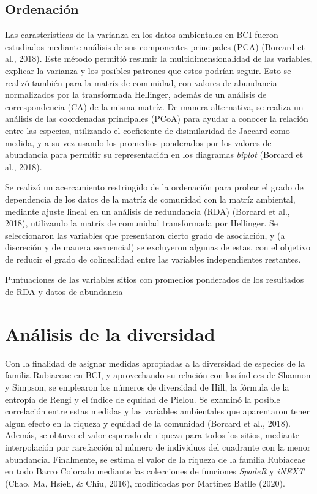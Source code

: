 \documentclass[11pt,]{article}
\begin{document}
\subsection{Ordenación}\label{ordenaciuxf3n}

Las carasteristicas de la varianza en los datos ambientales en BCI
fueron estudiados mediante análisis de sus componentes principales (PCA)
(Borcard et al., 2018). Este método permitió resumir la
multidimensionalidad de las variables, explicar la varianza y los
posibles patrones que estos podrían seguir. Esto se realizó también para
la matríz de comunidad, con valores de abundancia normalizados por la
transformada Hellinger, además de un análisis de correspondencia (CA) de
la misma matríz. De manera alternativa, se realiza un análisis de las
coordenadas principales (PCoA) para ayudar a conocer la relación entre
las especies, utilizando el coeficiente de disimilaridad de Jaccard como
medida, y a su vez usando los promedios ponderados por los valores de
abundancia para permitir su representación en los diagramas
\emph{biplot} (Borcard et al., 2018).

Se realizó un acercamiento restringido de la ordenación para probar el
grado de dependencia de los datos de la matríz de comunidad con la
matríz ambiental, mediante ajuste lineal en un análisis de redundancia
(RDA) (Borcard et al., 2018), utilizando la matríz de comunidad
transformada por Hellinger. Se seleccionaron las variables que
presentaron cierto grado de asociación, y (a discreción y de manera
secuencial) se excluyeron algunas de estas, con el objetivo de reducir
el grado de colinealidad entre las variables independientes restantes.

Puntuaciones de las variables sitios con promedios ponderados de los
resultados de RDA y datos de abundancia

\section{Análisis de la diversidad}\label{anuxe1lisis-de-la-diversidad}

Con la finalidad de asignar medidas apropiadas a la diversidad de
especies de la familia Rubiaceae en BCI, y aprovechando su relación con
los índices de Shannon y Simpson, se emplearon los números de diversidad
de Hill, la fórmula de la entropía de Rengi y el índice de equidad de
Pielou. Se examinó la posible correlación entre estas medidas y las
variables ambientales que aparentaron tener algun efecto en la riqueza y
equidad de la comunidad (Borcard et al., 2018). Además, se obtuvo el
valor esperado de riqueza para todos los sitios, mediante interpolación
por rarefacción al número de individuos del cuadrante con la menor
abundancia. Finalmente, se estima el valor de la riqueza de la familia
Rubiaceae en todo Barro Colorado mediante las colecciones de funciones
\emph{SpadeR} y \emph{iNEXT} (Chao, Ma, Hsieh, \& Chiu, 2016),
modificadas por Martínez Batlle (2020).
\end{document}
